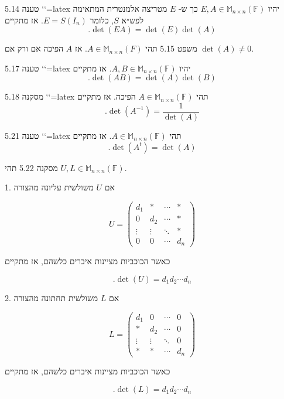 \documentclass[a4paper, 11pt]{article}
\begin{document}
\begin{envbox}[thmcolor]{טענה 5.14}
`\label{prop:elementary-det}`{=latex} יהיו $E,A\in\mathbb{M}_{n\times n}(\mathbb{F})$ כך ש- $E$ מטריצה אלמנטרית המתאימה לפש״א $S$, כלומר $E=S(I_n)$. אז מתקיים 
\[
.\det(EA)=\det(E)\det(A)
\]
\end{envbox}

\begin{envbox}[thmcolor]{משפט 5.15}
תהי $A\in\mathbb{M}_{n\times n}(F)$. אז $A$ הפיכה אם ורק אם $\det(A)\neq 0$.
\end{envbox}

\begin{envbox}[thmcolor]{טענה 5.17}
`\label{prop:det-product}`{=latex} יהיו $A,B\in\mathbb{M}_{n\times n}(\mathbb{F})$. אז מתקיים 
\[
.\det(AB)=\det(A)\det(B)
\]
\end{envbox}

\begin{envbox}[thmcolor]{מסקנה 5.18}
`\label{cor:det-inverse}`{=latex} תהי $A\in\mathbb{M}_{n\times n}(\mathbb{F})$ הפיכה. אז מתקיים 
\[
.\det(A^{-1})=\frac{1}{\det(A)}
\]
\end{envbox}

\begin{envbox}[thmcolor]{טענה 5.21}
`\label{prop:det-transpose}`{=latex} תהי $A\in\mathbb{M}_{n\times n}(\mathbb{F})$. אז מתקיים 
\[
.\det(A^t)=\det(A)
\]
\end{envbox}

\begin{envbox}[thmcolor]{מסקנה 5.22}
תהי $U,L\in\mathbb{M}_{n\times n}(\mathbb{F})$.

1.  אם $U$ משולשית עליונה מהצורה

    
\[
U=\begin{pmatrix}
    d_1 &* & \cdots & * \\
    0 & d_2 & \cdots & * \\
    \vdots & \vdots & \ddots & * \\
    0 & 0 & \cdots & d_n
    \end{pmatrix}
\]

    כאשר הכוכביות מציינות איברים כלשהם, אז מתקיים

    
\[
.\det(U)=d_1d_2\cdots d_n
\]

2.  אם $L$ משולשית תחתונה מהצורה

    
\[
L=\begin{pmatrix}
    d_1 &0 & \cdots & 0 \\
    * & d_2 & \cdots & 0 \\
    \vdots & \vdots & \ddots & 0 \\
    * & * & \cdots & d_n
    \end{pmatrix}
\]

    כאשר הכוכביות מציינות איברים כלשהם, אז מתקיים

    
\[
.\det(L)=d_1d_2\cdots d_n
\]
\end{envbox}
\end{document}
